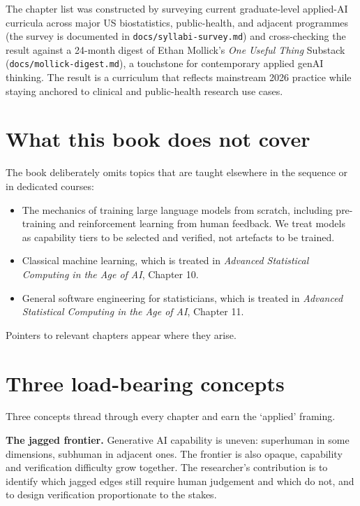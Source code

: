 \documentclass[
  letterpaper,
  11pt]{scrbook}
\providecommand{\tightlist}{%
  \setlength{\itemsep}{0pt}\setlength{\parskip}{0pt}}
\begin{document}
The chapter list was constructed by surveying current graduate-level
applied-AI curricula across major US biostatistics, public-health, and
adjacent programmes (the survey is documented in
\texttt{docs/syllabi-survey.md}) and cross-checking the result against a
24-month digest of Ethan Mollick's \emph{One Useful Thing} Substack
(\texttt{docs/mollick-digest.md}), a touchstone for contemporary applied
genAI thinking. The result is a curriculum that reflects mainstream 2026
practice while staying anchored to clinical and public-health research
use cases.

\section*{What this book does not
cover}\label{what-this-book-does-not-cover}


The book deliberately omits topics that are taught elsewhere in the
sequence or in dedicated courses:

\begin{itemize}
\tightlist
\item
  The mechanics of training large language models from scratch,
  including pre-training and reinforcement learning from human feedback.
  We treat models as capability tiers to be selected and verified, not
  artefacts to be trained.
\item
  Classical machine learning, which is treated in \emph{Advanced
  Statistical Computing in the Age of AI}, Chapter 10.
\item
  General software engineering for statisticians, which is treated in
  \emph{Advanced Statistical Computing in the Age of AI}, Chapter 11.
\end{itemize}

Pointers to relevant chapters appear where they arise.

\section*{Three load-bearing
concepts}\label{three-load-bearing-concepts}


Three concepts thread through every chapter and earn the `applied'
framing.

\textbf{The jagged frontier.} Generative AI capability is uneven:
superhuman in some dimensions, subhuman in adjacent ones. The frontier
is also opaque, capability and verification difficulty grow together.
The researcher's contribution is to identify which jagged edges still
require human judgement and which do not, and to design verification
proportionate to the stakes.
\end{document}
